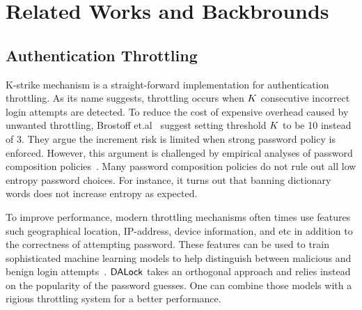 \section{Related Works and Backbrounds}\label{sec: relatedwork}

\subsection{Authentication Throttling} \label{related: Throttling}

 K-strike mechanism  is a straight-forward implementation for authentication throttling. As its name suggests, throttling occurs when $K$ consecutive incorrect login attempts are detected.  To reduce the cost of expensive overhead caused by unwanted throttling, Brostoff et.al~\cite{brostoff2003ten}  suggest setting threshold $K$ to be 10 instead of 3. They argue the increment risk is limited when strong password policy is enforced. However, this argument is challenged by empirical analyses of password composition policies~\cite{KSKMBCCE:SIGCHI11}\cite{BKPS:ACMEC13}. Many password composition policies do not rule out all low entropy password choices. For instance, it turns out that banning dictionary words does not increase entropy as expected.~\cite{KSKMBCCE:SIGCHI11} 

 To improve performance, modern throttling mechanisms\cite{sandhu2005system}\cite{gordon2014efficiently} often times use features such geographical location, IP-address, device information, and etc in addition to the correctness of attempting password. These features can be used to train sophisticated machine learning models to help distinguish between malicious and benign login attempts~\cite{NDSS:FJDBG16}. $\mathsf{DALock}$ takes an orthogonal approach and relies instead on the popularity of the password guesses. One can combine those models with a rigious throttling system for a better performance.

